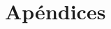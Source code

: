 \documentclass[12pt,a4paper]{book} %
\begin{document}
\part{Apéndices}

\appendix



%

%

\backmatter



%
\end{document}
